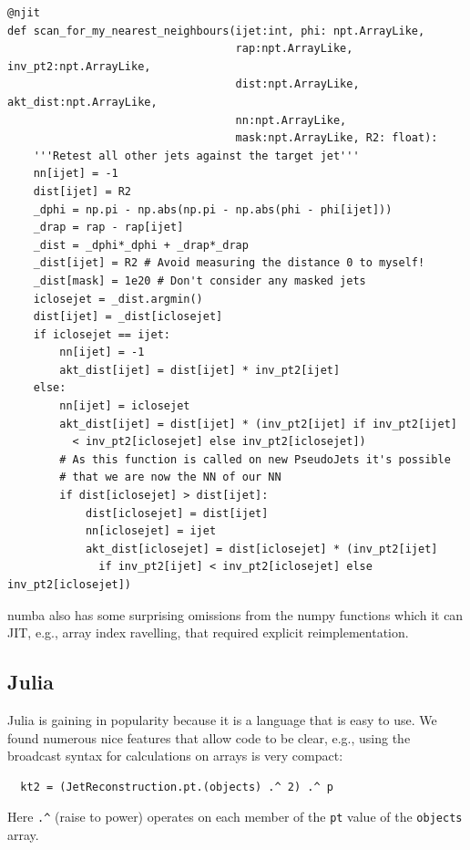 \documentclass{webofc}
\begin{document}
\begin{verbatim}
@njit
def scan_for_my_nearest_neighbours(ijet:int, phi: npt.ArrayLike, 
                                   rap:npt.ArrayLike, inv_pt2:npt.ArrayLike, 
                                   dist:npt.ArrayLike, akt_dist:npt.ArrayLike, 
                                   nn:npt.ArrayLike, 
                                   mask:npt.ArrayLike, R2: float):
    '''Retest all other jets against the target jet'''
    nn[ijet] = -1
    dist[ijet] = R2
    _dphi = np.pi - np.abs(np.pi - np.abs(phi - phi[ijet]))
    _drap = rap - rap[ijet]
    _dist = _dphi*_dphi + _drap*_drap
    _dist[ijet] = R2 # Avoid measuring the distance 0 to myself!
    _dist[mask] = 1e20 # Don't consider any masked jets
    iclosejet = _dist.argmin()
    dist[ijet] = _dist[iclosejet]
    if iclosejet == ijet:
        nn[ijet] = -1
        akt_dist[ijet] = dist[ijet] * inv_pt2[ijet]
    else:
        nn[ijet] = iclosejet
        akt_dist[ijet] = dist[ijet] * (inv_pt2[ijet] if inv_pt2[ijet] 
          < inv_pt2[iclosejet] else inv_pt2[iclosejet])
        # As this function is called on new PseudoJets it's possible
        # that we are now the NN of our NN
        if dist[iclosejet] > dist[ijet]:
            dist[iclosejet] = dist[ijet]
            nn[iclosejet] = ijet
            akt_dist[iclosejet] = dist[iclosejet] * (inv_pt2[ijet] 
              if inv_pt2[ijet] < inv_pt2[iclosejet] else inv_pt2[iclosejet])
\end{verbatim}

numba also has some surprising omissions from the numpy functions which it can
JIT, e.g., array index ravelling, that required explicit reimplementation.

\subsection{Julia}
\label{sec:julia-ergonomics}

Julia is gaining in popularity because it is a language that is easy to use.
We found numerous nice features that allow code to be clear, e.g., using the
broadcast syntax for calculations on arrays is very compact:

\begin{verbatim}
  kt2 = (JetReconstruction.pt.(objects) .^ 2) .^ p
\end{verbatim}

Here \texttt{.\^} (raise to power) operates on each member of the \texttt{pt}
value of the \texttt{objects} array.
\end{document}
